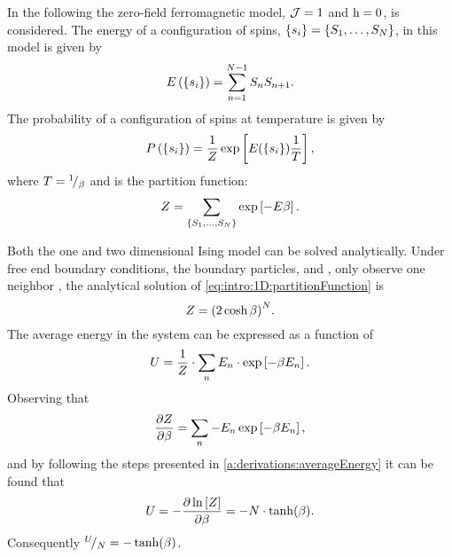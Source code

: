 	In the following the zero-field ferromagnetic model, \ie \mbox{$\mathcal{J} = 1$} and \mbox{$\mathrm{h} = 0$},  is considered. The energy \energy of a configuration of spins, \mbox{$\left\{s_{i}\right\} = \left\{S_{1}, \dotsc, S_{N} \right\}$}, in this model is given by 
	\begin{equation*}
		E\left(\left\{s_{i}\right\}\right) = \sum_{n = 1}^{N - 1}S_{n}S_{n+1}.
	\end{equation*}
	The probability of a configuration of spins  at temperature \temperature is given by
	\begin{equation*}
		P\left(\left\{s_{i}\right\}\right) = 
		\frac{1}{Z} \exp\left[{E(\left\{s_{i}\right\})}\frac{1}{T}\right],
	\end{equation*}
	where $T = {}^{1}\!/_{\beta}$ and \partitionfunction is the partition function:
	\begin{equation}
		\label{eq:intro:1D:partitionFunction}
		Z = \sum_{\left\{S_{1}, \dotsc, S_{N} \right\}} \exp\left[- E \beta \right].
	\end{equation}

	Both the one and two dimensional Ising model can be solved analytically. Under free end boundary conditions, \ie the boundary particles,  and , only observe one neighbor \cite{landau2014guide}, the analytical solution of \cref{eq:intro:1D:partitionFunction} is
	\begin{equation}
		\label{eq:introduced1D:partitionFunctionAnalyticalSolution}
		Z = {(2 \cosh \beta)}^N.
	\end{equation}
	The average energy in the system can be expressed as a function of \partitionfunction \cite{Murray20011Handout}
	\begin{equation*}
		U = \frac{1}{Z} \cdot \sum_{n} E_n \cdot \exp\left[-\beta E_n \right].		
	\end{equation*} 
	Observing that
	\begin{equation*}
		\frac{\partial Z}{\partial \beta} = \sum_{n} - E_n \exp\left[-\beta E_n \right],
	\end{equation*}
	and by following the steps presented in \cref{a:derivations:averageEnergy} it can be found that
	\begin{equation*}
		U = - \frac{\partial \ln \left[ Z \right]}{\partial \beta} = - N \cdot \tanh (\beta).
	\end{equation*}
	Consequently ${}^{U}\!/_{N} = - \tanh (\beta)$.

